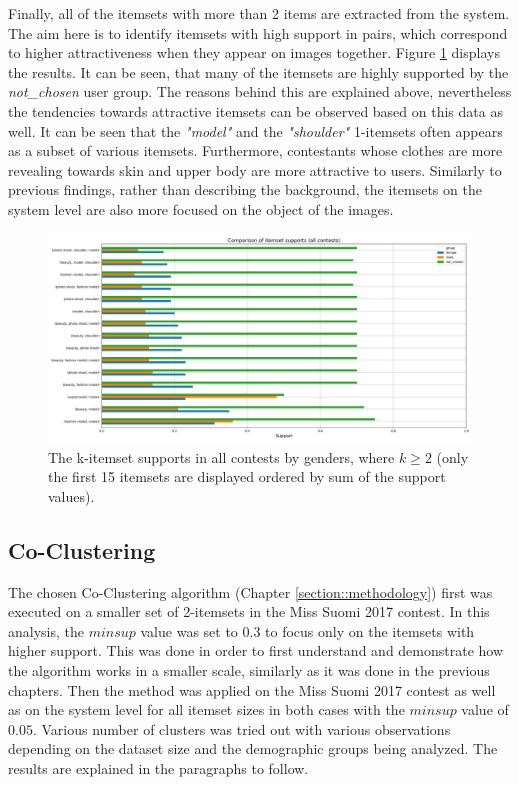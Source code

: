 Finally, all of the itemsets with more than 2 items are extracted from the system. The aim here is to identify itemsets with high support in pairs, which correspond to higher attractiveness when they appear on images together. Figure \ref{itemset_supports-gender-all_contests-over2_itemset} displays the results. It can be seen, that many of the itemsets are highly supported by the \textit{not\_chosen} user group. The reasons behind this are explained above, nevertheless the tendencies towards attractive itemsets can be observed based on this data as well. It can be seen that the \textit{"{model}"} and the \textit{"{shoulder}"} 1-itemsets often appears as a subset of various itemsets. Furthermore, contestants whose clothes are more revealing towards skin and upper body are more attractive to users. Similarly to previous findings, rather than describing the background, the itemsets on the system level are also more focused on the object of the images. 

\begin{figure}[h] 
    \begin{center}
        \includegraphics[width=1.0\textwidth]{Images/itemset_supports-gender-all_contests-over2_itemset.png}
        \caption{The k-itemset supports in all contests by genders, where $k \geq 2$ (only the first 15 itemsets are displayed ordered by sum of the support values).}
        \label{itemset_supports-gender-all_contests-over2_itemset}
    \end{center}
\end{figure}

\subsection{Co-Clustering}
The chosen Co-Clustering algorithm (Chapter \ref{section::methodology}) first was executed on a smaller set of 2-itemsets in the Miss Suomi 2017 contest. In this analysis, the $minsup$ value was set to $0.3$ to focus only on the itemsets with higher support. This was done in order to first understand and demonstrate how the algorithm works in a smaller scale, similarly as it was done in the previous chapters. Then the method was applied on the Miss Suomi 2017 contest as well as on the system level for all itemset sizes in both cases with the $minsup$ value of $0.05$. Various number of clusters was tried out with various observations depending on the dataset size and the demographic groups being analyzed. The results are explained in the paragraphs to follow. 

